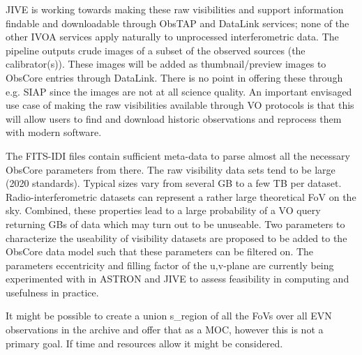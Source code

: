 \documentclass[11pt,a4paper]{ivoa}
\begin{document}
JIVE is working towards making these raw visibilities and support information findable and downloadable 
through ObsTAP and DataLink services; none of the other IVOA services apply naturally to unprocessed 
interferometric data. The pipeline outputs crude images of a subset of the observed sources (the 
calibrator(s)). These images will be added as thumbnail/preview images to ObsCore entries through 
DataLink. There is no point in offering these through e.g. SIAP since the images are not at all science 
quality. An important envisaged use case of making the raw visibilities available through VO protocols 
is that this will allow users to find and download historic observations and reprocess them with modern 
software.

The FITS-IDI files contain sufficient meta-data to parse almost all the necessary ObsCore parameters 
from there. The raw visibility data sets tend to be large (2020 standards). Typical sizes vary from 
several GB to a few TB per dataset. Radio-interferometric datasets can represent a rather large 
theoretical FoV on the sky. Combined, these properties lead to a large probability of a VO query 
returning GBs of data which may turn out to be unuseable. Two parameters to characterize the useability 
of visibility datasets are proposed to be added to the ObsCore data model such that these parameters can 
be filtered on. The parameters eccentricity and filling factor of the u,v-plane are currently being 
experimented with in ASTRON and JIVE to assess feasibility in computing and usefulness in practice.

It might be possible to create a union s\_region of all the FoVs over all EVN observations in the 
archive and offer that as a MOC, however this is not a primary goal. If time and resources allow it 
might be considered.
\end{document}
